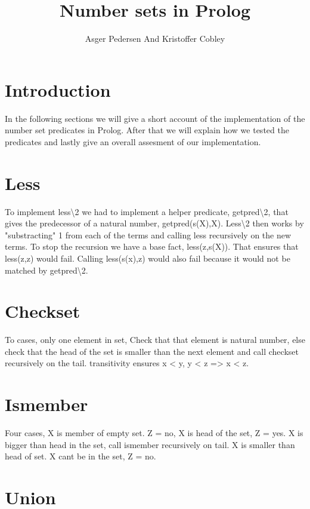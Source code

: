 \documentclass[]{article}
\title{Number sets in Prolog}
\author{ Asger Pedersen And Kristoffer Cobley}
\begin{document}
\ifpdf
{}
\else
{}
\fi

\maketitle
\setcounter{tocdepth}{1}
\tableofcontents
\newpage
\section{Introduction} %
\label{sec:introduction}
In the following sections we will give a short account of the implementation of the number set predicates in Prolog. After that we will explain how we tested the predicates and lastly give an overall assesment of our implementation.
\section{Less} %
\label{sec:less}
To implement less\textbackslash2 we had to implement a helper predicate, getpred\textbackslash2, that gives the predecessor of a natural number, getpred(s(X),X). Less\textbackslash2 then works by "substracting" 1 from each of the terms and calling less recursively on the new terms. To stop the recursion we have a base fact, less(z,s(X)). That ensures that less(z,z) would fail. Calling less(s(x),z) would also fail because it would not be matched by getpred\textbackslash2.
\section{Checkset} %
\label{sec:checkset}
To cases, only one element in set, Check that that element is natural number, else check that the head of the set is smaller than the next element and call checkset recursively on the tail. transitivity ensures x < y, y < z => x < z.
\section{Ismember} %
\label{sec:ismember}
Four cases, X is member of empty set. Z = no,
X is head of the set, Z = yes.
X is bigger than  head in the set, call ismember recursively on tail.
X is smaller than head of set. X cant be in the set, Z = no.
\section{Union} %
\label{sec:union}
\end{document}

